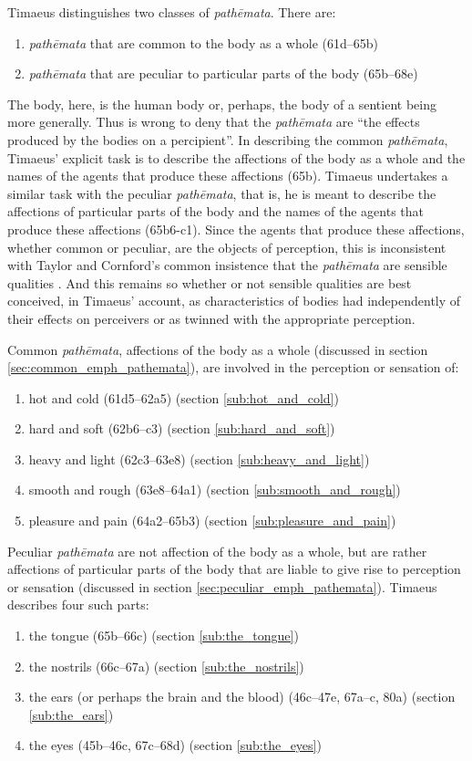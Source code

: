 Timaeus distinguishes two classes of \emph{pathēmata}. There are:
\begin{enumerate}
	\item \emph{pathēmata} that are common to the body as a whole (61d--65b)
	\item \emph{pathēmata} that are peculiar to particular parts of the body (65b--68e)
\end{enumerate}
The body, here, is the human body or, perhaps, the body of a sentient being more generally. Thus \citet[431]{Taylor:1928qb} is wrong to deny that the \emph{pathēmata} are ``the effects produced by the bodies on a percipient''. In describing the common \emph{pathēmata}, Timaeus' explicit task is to describe the affections of the body as a whole and the names of the agents that produce these affections (65b). Timaeus undertakes a similar task with the peculiar \emph{pathēmata}, that is, he is meant to describe the affections of particular parts of the body and the names of the agents that produce these affections (65b6-c1). Since the agents that produce these affections, whether common or peculiar, are the objects of perception, this is inconsistent with Taylor and Cornford's common insistence that the \emph{pathēmata} are sensible qualities \citep[see][225, n8]{Archer-Hind:1888qd}. And this remains so whether or not sensible qualities are best conceived, in Timaeus' account, as characteristics of bodies had independently of their effects on perceivers or as twinned with the appropriate perception. 

Common \emph{pathēmata}, affections of the body as a whole (discussed in section \ref{sec:common_emph_pathemata}), are involved in the perception or sensation of:
\begin{enumerate}
 	\item hot and cold (61d5--62a5) (section \ref{sub:hot_and_cold})
 	\item hard and soft (62b6--c3) (section \ref{sub:hard_and_soft})
 	\item heavy and light (62c3--63e8) (section \ref{sub:heavy_and_light})
 	\item smooth and rough (63e8--64a1) (section \ref{sub:smooth_and_rough})
 	\item pleasure and pain (64a2--65b3) (section \ref{sub:pleasure_and_pain})
\end{enumerate}

Peculiar \emph{pathēmata} are not affection of the body as a whole, but are rather affections of particular parts of the body that are liable to give rise to perception or sensation (discussed in section \ref{sec:peculiar_emph_pathemata}). Timaeus describes four such parts:
\begin{enumerate}
	\item the tongue (65b--66c) (section \ref{sub:the_tongue})
	\item the nostrils (66c--67a) (section \ref{sub:the_nostrils})
	\item the ears (or perhaps the brain and the blood) (46c--47e, 67a--c, 80a) (section \ref{sub:the_ears})
	\item the eyes (45b--46c, 67c--68d) (section \ref{sub:the_eyes})
\end{enumerate}

